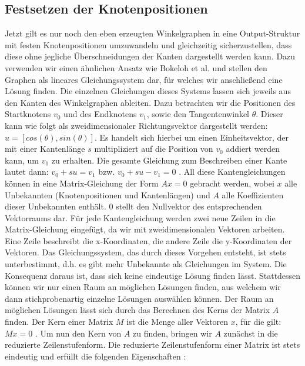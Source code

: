 \subsection{Festsetzen der Knotenpositionen}
Jetzt gilt es nur noch den eben erzeugten Winkelgraphen in eine Output-Struktur mit festen Knotenpositionen umzuwandeln und gleichzeitig sicherzustellen,
dass diese ohne jegliche Überschneidungen der Kanten dargestellt werden kann. Dazu verwenden wir einen ähnlichen Ansatz wie Bokeloh et al. \cite{4_bokeloh_et_al}
und stellen den Graphen als lineares Gleichungssystem dar, für welches wir anschließend eine Lösung finden. Die einzelnen Gleichungen dieses Systems lassen
sich jeweils aus den Kanten des Winkelgraphen ableiten. Dazu betrachten wir die Positionen des Startknotens \(v_0\) und des Endknotens \(v_1\), sowie den
Tangentenwinkel \(\theta\). Dieser kann wie folgt als zweidimensionaler Richtungsvektor dargestellt werden: \(u = [cos(\theta), sin(\theta)]\). Es handelt
sich hierbei um einen Einheitsvektor, der mit einer Kantenlänge \(s\) multipliziert auf die Position von \(v_0\) addiert werden kann, um \(v_1\) zu erhalten.
Die gesamte Gleichung zum Beschreiben einer Kante lautet dann: \(v_0 + su = v_1\) bzw. \(v_0 + su - v_1 = 0\) \cite{1_merrell}. All diese Kantengleichungen können in eine
Matrix-Gleichung der Form \(Ax = 0\) gebracht werden, wobei \(x\) alle Unbekannten (Knotenpositionen und Kantenlängen) und \(A\) alle Koeffizienten dieser
Unbekannten enthält. \(0\) stellt den Nullvektor des entsprechenden Vektorraums dar. Für jede Kantengleichung werden zwei neue Zeilen in die Matrix-Gleichung
eingefügt, da wir mit zweidimensionalen Vektoren arbeiten. Eine Zeile beschreibt die x-Koordinaten, die andere Zeile die y-Koordinaten der Vektoren.
Das Gleichungssystem, das durch dieses Vorgehen entsteht, ist stets
unterbestimmt, d.h. es gibt mehr Unbekannte als Gleichungen im System. Die Konsequenz daraus ist, dass sich keine eindeutige Lösung finden lässt.
Stattdessen können wir nur einen Raum an möglichen Lösungen finden, aus welchem wir dann stichprobenartig einzelne Lösungen auswählen können. Der Raum an
möglichen Lösungen lässt sich durch das Berechnen des Kerns der Matrix \(A\) finden. Der Kern einer Matrix \(M\) ist die Menge aller Vektoren \(x\), für die gilt:
\(Mx = 0\) \cite{48_studysmarter}. Um nun den Kern von \(A\) zu finden, bringen wir \(A\) zunächst in die reduzierte Zeilenstufenform. Die reduzierte
Zeilenstufenform einer Matrix ist stets eindeutig und erfüllt die folgenden Eigenschaften \cite{47_meyer}:

